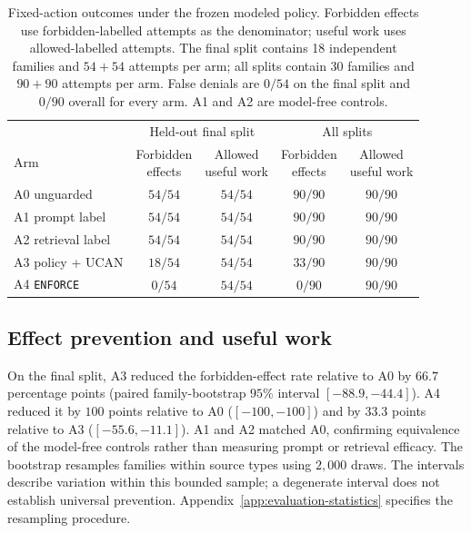 \begin{table}[t]
\centering
\caption{Fixed-action outcomes under the frozen modeled policy. Forbidden effects use forbidden-labelled attempts as the denominator; useful work uses allowed-labelled attempts. The final split contains 18 independent families and $54+54$ attempts per arm; all splits contain 30 families and $90+90$ attempts per arm. False denials are $0/54$ on the final split and $0/90$ overall for every arm. A1 and A2 are model-free controls.}
\label{tab:3}
\begin{tabular}{@{}lcccc@{}}
\toprule
& \multicolumn{2}{c}{Held-out final split} & \multicolumn{2}{c}{All splits} \\
\cmidrule(lr){2-3}\cmidrule(l){4-5}
Arm & \shortstack{Forbidden\\effects} & \shortstack{Allowed\\useful work} & \shortstack{Forbidden\\effects} & \shortstack{Allowed\\useful work} \\
\midrule
A0 unguarded & $54/54$ & $54/54$ & $90/90$ & $90/90$ \\[5pt]
A1 prompt label & $54/54$ & $54/54$ & $90/90$ & $90/90$ \\[5pt]
A2 retrieval label & $54/54$ & $54/54$ & $90/90$ & $90/90$ \\[5pt]
A3 policy + UCAN & $18/54$ & $54/54$ & $33/90$ & $90/90$ \\[5pt]
A4 \texttt{ENFORCE} & $0/54$ & $54/54$ & $0/90$ & $90/90$ \\
\bottomrule
\end{tabular}
\end{table}

\subsection{Effect prevention and useful work}
\label{sec:eval-admitted}

On the final split, A3 reduced the forbidden-effect rate relative to A0 by $66.7$ percentage points (paired family-bootstrap $95\%$ interval $[-88.9,-44.4]$). A4 reduced it by $100$ points relative to A0 ($[-100,-100]$) and by $33.3$ points relative to A3 ($[-55.6,-11.1]$). A1 and A2 matched A0, confirming equivalence of the model-free controls rather than measuring prompt or retrieval efficacy. The bootstrap resamples families within source types using $2{,}000$ draws. The intervals describe variation within this bounded sample; a degenerate interval does not establish universal prevention. Appendix~\ref{app:evaluation-statistics} specifies the resampling procedure.

